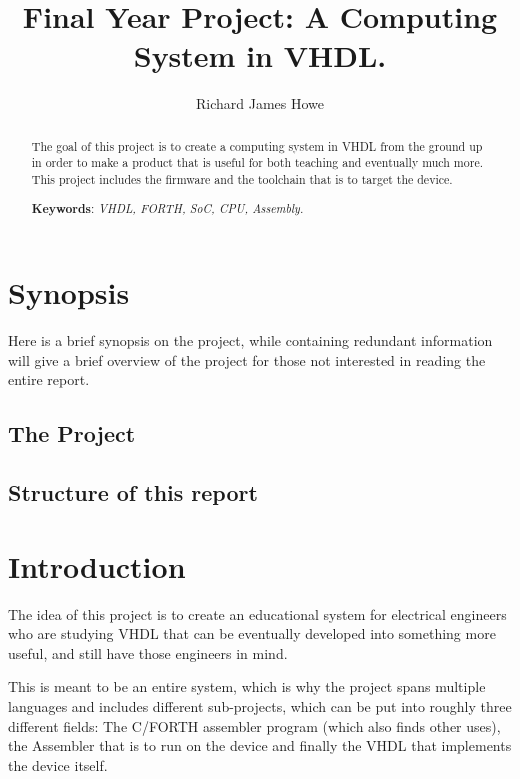 \documentclass	[a4paper, 10pt]	{article}
\title		{Final Year Project: A Computing System in VHDL.}
\author		{Richard James Howe}
\begin{document}
	\maketitle
	\hrulefill

	\begin{abstract}
    The goal of this project is to create a computing system in VHDL from the
    ground up in order to make a product that is useful for both teaching and
    eventually much more. This project includes the firmware and the toolchain
    that is to target the device.

      \smallskip
      \begin{center}
      \noindent \textbf{Keywords}: \emph{VHDL, FORTH, SoC, CPU, Assembly.}
      \end{center}
	\end{abstract}

	\tableofcontents
  \listoffigures

  \section{Synopsis}

    Here is a brief synopsis on the project, while containing redundant information
    will give a brief overview of the project for those not interested in reading
    the entire report.

    \subsection{The Project}

    \subsection{Structure of this report}

  \section{Introduction}

  The idea of this project is to create an educational system for electrical
  engineers who are studying VHDL that can be eventually developed into something 
  more useful, and still have those engineers in mind. 

  This is meant to be an entire system, which is why the project spans multiple
  languages and includes different sub-projects, which can be put into roughly
  three different fields: The C/FORTH assembler program (which also finds other
  uses), the Assembler that is to run on the device and finally the VHDL that implements
  the device itself.
\end{document}
